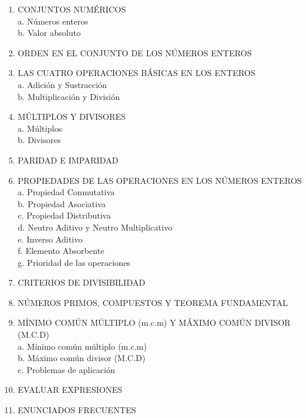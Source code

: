 \documentclass[10pt]{article}
\begin{document}
\begin{enumerate}
  \item CONJUNTOS NUMÉRICOS\\
a. Números enteros\\
b. Valor absoluto
  \item ORDEN EN EL CONJUNTO DE LOS NÚMEROS ENTEROS
  \item LAS CUATRO OPERACIONES BÁSICAS EN LOS ENTEROS\\
a. Adición y Sustracción\\
b. Multiplicación y División
  \item MÚLTIPLOS Y DIVISORES\\
a. Múltiplos\\
b. Divisores
  \item PARIDAD E IMPARIDAD
  \item PROPIEDADES DE LAS OPERACIONES EN LOS NÚMEROS ENTEROS\\
a. Propiedad Conmutativa\\
b. Propiedad Asociativa\\
c. Propiedad Distributiva\\
d. Neutro Aditivo y Neutro Multiplicativo\\
e. Inverso Aditivo\\
f. Elemento Absorbente\\
g. Prioridad de las operaciones
  \item CRITERIOS DE DIVISIBILIDAD
  \item NÚMEROS PRIMOS, COMPUESTOS Y TEOREMA FUNDAMENTAL
  \item MÍNIMO COMÚN MÚLTIPLO (m.c.m) Y MÁXIMO COMÚN DIVISOR (M.C.D)\\
a. Mínimo común múltiplo (m.c.m)\\
b. Máximo común divisor (M.C.D)\\
c. Problemas de aplicación
  \item EVALUAR EXPRESIONES
  \item ENUNCIADOS FRECUENTES
\end{enumerate}
\end{document}
